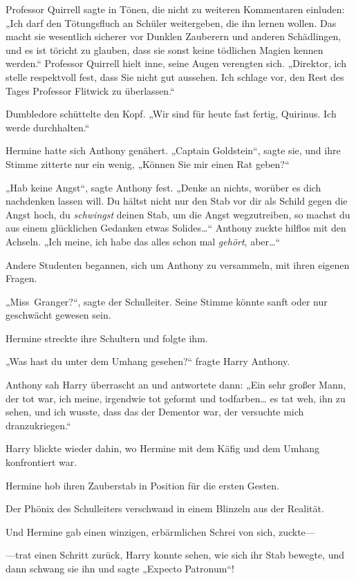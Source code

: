 {Professor Quirrell sagte in Tönen, die nicht zu weiteren Kommentaren einluden: „Ich darf den Tötungsfluch an Schüler weitergeben, die ihn lernen wollen. Das macht sie wesentlich sicherer vor Dunklen Zauberern und anderen Schädlingen, und es ist töricht zu glauben, dass sie sonst keine tödlichen Magien kennen werden.“ Professor Quirrell hielt inne, seine Augen verengten sich. „Direktor, ich stelle respektvoll fest, dass Sie nicht gut aussehen. Ich schlage vor, den Rest des Tages Professor Flitwick zu überlassen.“

Dumbledore schüttelte den Kopf. „Wir sind für heute fast fertig, Quirinus. Ich werde durchhalten.“

Hermine hatte sich Anthony genähert. „Captain Goldstein“, sagte sie, und ihre Stimme zitterte nur ein wenig, „Können Sie mir einen Rat geben?“

„Hab keine Angst“, sagte Anthony fest. „Denke an nichts, worüber es dich nachdenken lassen will. Du hältst nicht nur den Stab vor dir als Schild gegen die Angst hoch, du \emph{schwingst} deinen Stab, um die Angst wegzutreiben, so machst du aus einem glücklichen Gedanken etwas Solides…“ Anthony zuckte hilflos mit den Achseln. „Ich meine, ich habe das alles schon mal \emph{gehört}, aber…“

Andere Studenten begannen, sich um Anthony zu versammeln, mit ihren eigenen Fragen.

„Miss~Granger?“, sagte der Schulleiter. Seine Stimme könnte sanft oder nur geschwächt gewesen sein.

Hermine streckte ihre Schultern und folgte ihm.

„Was hast du unter dem Umhang gesehen?“ fragte Harry Anthony.

Anthony sah Harry überrascht an und antwortete dann: „Ein sehr großer Mann, der tot war, ich meine, irgendwie tot geformt und todfarben… es tat weh, ihn zu sehen, und ich wusste, dass das der Dementor war, der versuchte mich dranzukriegen.“

Harry blickte wieder dahin, wo Hermine mit dem Käfig und dem Umhang konfrontiert war.

Hermine hob ihren Zauberstab in Position für die ersten Gesten.

Der Phönix des Schulleiters verschwand in einem Blinzeln aus der Realität.

Und Hermine gab einen winzigen, erbärmlichen Schrei von sich, zuckte—

—trat einen Schritt zurück, Harry konnte sehen, wie sich ihr Stab bewegte, und dann schwang sie ihn und sagte „Expecto Patronum“!

}
